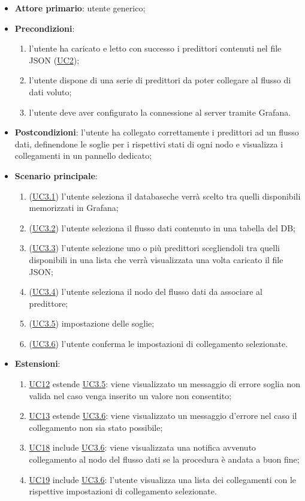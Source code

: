 		\begin{itemize}
			\item\textbf{Attore primario}: utente generico;
			\item\textbf{Precondizioni}:
				\begin{enumerate}
					\item l’utente ha caricato e letto con successo i predittori contenuti nel file JSON (\hyperref[par:UC2]{UC2});
					\item l’utente dispone di una serie di predittori da poter collegare al flusso di dati voluto;
					\item l’utente deve aver configurato la connessione al server tramite Grafana.	
				\end{enumerate}
			\item\textbf{Postcondizioni}: l’utente ha collegato correttamente i predittori ad un flusso dati, definendone le soglie per i rispettivi stati di ogni nodo e visualizza i collegamenti in un pannello dedicato;
			\item\textbf{Scenario principale}:
				\begin{enumerate}
					\item (\hyperref[par:UC3.1]{UC3.1}) l’utente seleziona il database\glo che verrà scelto tra quelli disponibili memorizzati in Grafana;
					\item (\hyperref[par:UC3.2]{UC3.2}) l’utente seleziona il flusso dati contenuto in una tabella del DB;
					\item (\hyperref[par:UC3.3]{UC3.3}) l'utente selezione uno o più predittori scegliendoli tra quelli disponibili in una lista che verrà visualizzata una volta caricato il file JSON;
					\item (\hyperref[par:UC3.4]{UC3.4}) l'utente seleziona il nodo del flusso dati da associare al predittore;
					\item (\hyperref[par:UC3.5]{UC3.5}) impostazione delle soglie;
					\item (\hyperref[par:UC3.6]{UC3.6}) l'utente conferma le impostazioni di collegamento selezionate.	
				\end{enumerate}
			\item\textbf{Estensioni}:
				\begin{enumerate}
					\item\hyperref[par:UC12]{UC12} estende \hyperref[par:UC3.5]{UC3.5}: viene visualizzato un messaggio di errore soglia non valida nel caso venga inserito un valore non consentito;
					\item\hyperref[par:UC13]{UC13} estende \hyperref[par:UC3.6]{UC3.6}: viene visualizzato un messaggio d’errore nel caso il collegamento non sia stato possibile;
					\item\hyperref[par:UC18]{UC18} include \hyperref[par:UC3.6]{UC3.6}: viene visualizzata una notifica avvenuto collegamento al nodo del flusso dati se la procedura è andata a buon fine;
					\item\hyperref[par:UC19]{UC19} include \hyperref[par:UC3.6]{UC3.6}: l'utente visualizza una lista dei collegamenti con le rispettive impostazioni di collegamento selezionate.
				\end{enumerate}
		\end{itemize}
		
